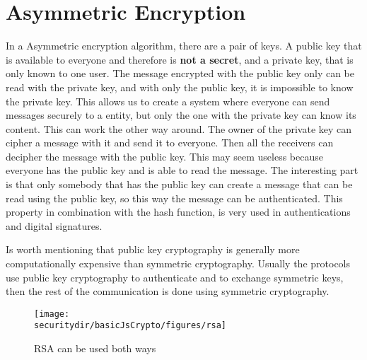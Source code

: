 \section{Asymmetric Encryption}

In a Asymmetric encryption algorithm, there are a pair of keys. A public key that is available to everyone and therefore is \textbf{not a secret}, and a private key, that is only known to one user. The message encrypted with the public key only can be read with the private key, and with only the public key, it is impossible to know the private key. This allows us to create a system where everyone can send messages securely to a entity, but only the one with the private key can know its content.
This can work the other way around. The owner of the private key can cipher a message with it and send it to everyone. Then all the receivers can decipher the message with the public key. This may seem useless because everyone has the public key and is able to read the message. The interesting part is that only somebody that has the public key can create a message that can be read using the public key, so this way the message can be authenticated. This property in combination with the hash function, is very used in authentications and digital signatures.

Is worth mentioning that public key cryptography is generally more computationally expensive than symmetric cryptography. Usually the protocols use public key cryptography to authenticate and to exchange symmetric keys, then the rest of the communication is done using symmetric cryptography.
 
\begin{figure}[htb]
	\begin{centering}
		\texttt{[image: \\securitydir/basicJsCrypto/figures/rsa]}
		\par\end{centering}
	\caption{\label{fig:rsa} RSA can be used both ways}
\end{figure}